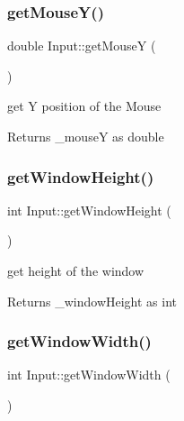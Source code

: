 \subsubsection{\texorpdfstring{get\+Mouse\+Y()}{getMouseY()}}
{\footnotesize\ttfamily double Input\+::get\+MouseY (\begin{DoxyParamCaption}{ }\end{DoxyParamCaption})\hspace{0.3cm}{\ttfamily [inline]}}



get Y position of the Mouse 

\begin{DoxyReturn}{Returns}
\+\_\+mouseY as double 
\end{DoxyReturn}
\mbox{\label{class_input_a3eccc8d5cd466b7ec312e3af7b801473}} 
\subsubsection{\texorpdfstring{get\+Window\+Height()}{getWindowHeight()}}
{\footnotesize\ttfamily int Input\+::get\+Window\+Height (\begin{DoxyParamCaption}{ }\end{DoxyParamCaption})\hspace{0.3cm}{\ttfamily [inline]}}



get height of the window 

\begin{DoxyReturn}{Returns}
\+\_\+window\+Height as int 
\end{DoxyReturn}
\mbox{\label{class_input_a8e4f99acfe8cadda2879697be26bf295}} 
\subsubsection{\texorpdfstring{get\+Window\+Width()}{getWindowWidth()}}
{\footnotesize\ttfamily int Input\+::get\+Window\+Width (\begin{DoxyParamCaption}{ }\end{DoxyParamCaption})\hspace{0.3cm}{\ttfamily [inline]}}



